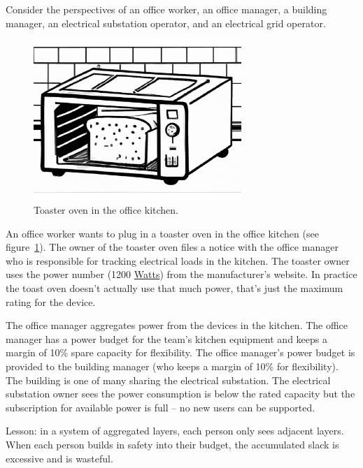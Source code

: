 Consider the perspectives of an office worker, an office manager, a building manager, an electrical substation operator, and an electrical grid operator.
\begin{center}
\begin{figure}
    \centering
    \includegraphics[width=0.7\textwidth]{images/toaster_oven_in_office_kitchen.pdf}
    \caption{Toaster oven in the office kitchen.}
    \label{fig:toaster_oven}
\end{figure}
\end{center}

\begin{mdframed}
An office worker wants to plug in a toaster oven in the office kitchen (see figure~\ref{fig:toaster_oven}). The owner of the toaster oven files a notice with the office manager who is responsible for tracking electrical loads in the kitchen. 
The toaster owner uses the power number (1200 \href{https://en.wikipedia.org/wiki/Watt}{Watts}) 
from the manufacturer's website. In practice the toast oven doesn't actually use that much power, that's just the maximum rating for the device. 

The office manager aggregates power from the devices in the kitchen. The office manager has a power budget for the team's kitchen equipment and keeps a margin of 10\% spare capacity for flexibility. The office manager's power budget is provided to the building manager (who keeps a margin of 10\% for flexibility). The building is one of many sharing the electrical substation. The electrical substation owner sees the power consumption is below the rated capacity but the subscription for available power is full -- no new users can be supported.
\end{mdframed}
Lesson: in a system of aggregated layers, each person only sees adjacent layers. When each person builds in safety into their budget, the accumulated slack is excessive and is wasteful.

